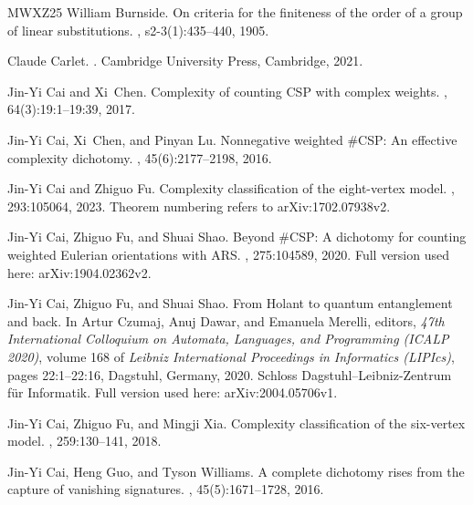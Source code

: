\documentclass[11pt,letterpaper,onecolumn]{article}
\theoremstyle{plain}
\theoremstyle{definition}
\theoremstyle{remark}
\begin{document}
\begin{thebibliography}{MWXZ25}
William Burnside.
\newblock On criteria for the finiteness of the order of a group of linear
  substitutions.
,
  s2-3(1):435--440, 1905.

Claude Carlet.
.
\newblock Cambridge University Press, Cambridge, 2021.

Jin-Yi Cai and Xi~Chen.
\newblock Complexity of counting {CSP} with complex weights.
, 64(3):19:1--19:39, 2017.

Jin-Yi Cai, Xi~Chen, and Pinyan Lu.
\newblock Nonnegative weighted {{\#CSP}}: An effective complexity dichotomy.
, 45(6):2177--2198, 2016.

Jin-Yi Cai and Zhiguo Fu.
\newblock Complexity classification of the eight-vertex model.
, 293:105064, 2023.
\newblock Theorem numbering refers to arXiv:1702.07938v2.

Jin-Yi Cai, Zhiguo Fu, and Shuai Shao.
\newblock Beyond {\#}{CSP}: A dichotomy for counting weighted {Eulerian}
  orientations with {ARS}.
, 275:104589, 2020.
\newblock Full version used here: arXiv:1904.02362v2.

Jin-Yi Cai, Zhiguo Fu, and Shuai Shao.
\newblock From {Holant} to quantum entanglement and back.
\newblock In Artur Czumaj, Anuj Dawar, and Emanuela Merelli, editors, {\em 47th
  International Colloquium on Automata, Languages, and Programming (ICALP
  2020)}, volume 168 of {\em Leibniz International Proceedings in Informatics
  (LIPIcs)}, pages 22:1--22:16, Dagstuhl, Germany, 2020. Schloss
  Dagstuhl--Leibniz-Zentrum f{\"u}r Informatik.
\newblock Full version used here: arXiv:2004.05706v1.

Jin-Yi Cai, Zhiguo Fu, and Mingji Xia.
\newblock Complexity classification of the six-vertex model.
, 259:130--141, 2018.

Jin-Yi Cai, Heng Guo, and Tyson Williams.
\newblock A complete dichotomy rises from the capture of vanishing signatures.
, 45(5):1671--1728, 2016.


\end{thebibliography}
\end{document}
